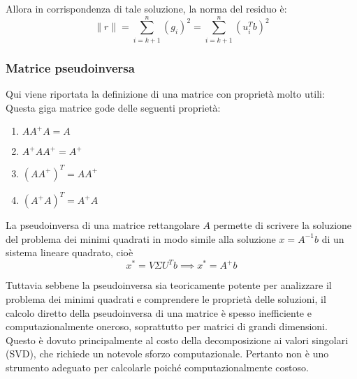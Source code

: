 Allora in corrispondenza di tale soluzione, la norma del residuo è:
\[
    \|r\| = \sum_{i=k+1}^{n}(g_i)^2 = \sum_{i=k+1}^{n} (u^T_i b)^2   
\]
\subsubsection{Matrice pseudoinversa}
Qui viene riportata la definizione di una matrice con proprietà molto utili:
Questa giga matrice gode delle seguenti proprietà:
\begin{enumerate}
    \item \( AA^+ A = A \)
    \item \( A^+ AA^+ = A^+ \)
    \item \( (AA^+)^T = AA^+ \)
    \item \( (A^+ A)^T = A^+ A \)
\end{enumerate}

La pseudoinversa di una matrice rettangolare $A$ permette di scrivere la soluzione del problema dei minimi quadrati in modo simile alla soluzione $x=A^{-1}b$ di un sistema lineare quadrato, cioè
\[
    x^* = V\Sigma U^T b \implies x^* = A^+ b
\]

Tuttavia sebbene la pseudoinversa sia teoricamente potente per analizzare il problema dei minimi quadrati e comprendere le proprietà delle soluzioni, il calcolo diretto della pseudoinversa di una matrice è spesso inefficiente e computazionalmente oneroso, soprattutto per matrici di grandi dimensioni. Questo è dovuto principalmente al costo della decomposizione ai valori singolari (SVD), che richiede un notevole sforzo computazionale. Pertanto non è uno strumento adeguato per calcolarle poiché computazionalmente costoso.

